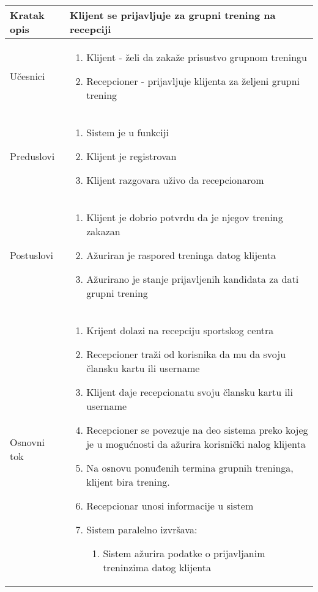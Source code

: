 \documentclass[../grupniTreninzi.tex]{subfiles}
\begin{document}
\begin{longtable}{| p{} | p{} |} 
\hline
    Kratak opis &  Klijent se prijavljuje za grupni trening na recepciji\\ 
\hline    
    Učesnici &
    \begin{enumerate}
        \item Klijent - želi da zakaže prisustvo grupnom treningu
        \item Recepcioner - prijavljuje klijenta za željeni grupni trening 
    \end{enumerate}\\
\hline
   Preduslovi & 
   \begin{enumerate}
        \item Sistem je u funkciji
        \item Klijent je registrovan
        \item Klijent razgovara uživo da recepcionarom
    \end{enumerate}\\
\hline  
    Postuslovi &
    \begin{enumerate}
        \item Klijent je dobrio potvrdu da je njegov trening zakazan
        \item Ažuriran je raspored treninga datog klijenta
        \item Ažurirano je stanje prijavljenih kandidata za dati grupni trening
    \end{enumerate}\\
\hline
    Osnovni tok & 
    \begin{enumerate}
        \item Krijent dolazi na recepciju sportskog centra
        \item Recepcioner traži od korisnika da mu da svoju člansku kartu ili username
        \item Klijent daje recepcionatu svoju člansku kartu ili username
        \item Recepcioner se povezuje na deo sistema preko kojeg je u mogućnosti da ažurira korisnički nalog klijenta
        \item Na osnovu ponuđenih termina grupnih treninga, klijent bira trening.
        \item Recepcionar unosi informacije u sistem
        \item Sistem paralelno izvršava:
            \begin{enumerate}
                \item Sistem ažurira podatke o prijavljanim treninzima datog klijenta

\end{enumerate}
\end{enumerate}
\end{longtable}
\end{document}
